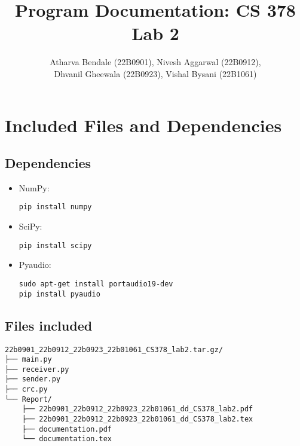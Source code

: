\documentclass[11pt]{article}
\title{Program Documentation: CS 378 Lab 2}
\author{Atharva Bendale (22B0901), Nivesh Aggarwal (22B0912), \\ Dhvanil Gheewala (22B0923), Vishal Bysani (22B1061)}
\begin{document}
\maketitle

\section{Included Files and Dependencies}

\subsection*{Dependencies}
\begin{itemize}
    \item NumPy:
    \begin{tcolorbox}
      \texttt{pip install numpy}
    \end{tcolorbox}
    
    \item SciPy:
    \begin{tcolorbox}
      \texttt{pip install scipy}
    \end{tcolorbox}
    
    \item Pyaudio:
    \begin{tcolorbox}
      \texttt{sudo apt-get install portaudio19-dev}\\
        \texttt{pip install pyaudio}
    \end{tcolorbox}
\end{itemize}

\subsection*{Files included}
\begin{Verbatim}[frame=single]
22b0901_22b0912_22b0923_22b01061_CS378_lab2.tar.gz/
├── main.py
├── receiver.py
├── sender.py
├── crc.py
└── Report/
    ├── 22b0901_22b0912_22b0923_22b01061_dd_CS378_lab2.pdf
    ├── 22b0901_22b0912_22b0923_22b01061_dd_CS378_lab2.tex
    ├── documentation.pdf
    └── documentation.tex
\end{Verbatim}

\end{document}

